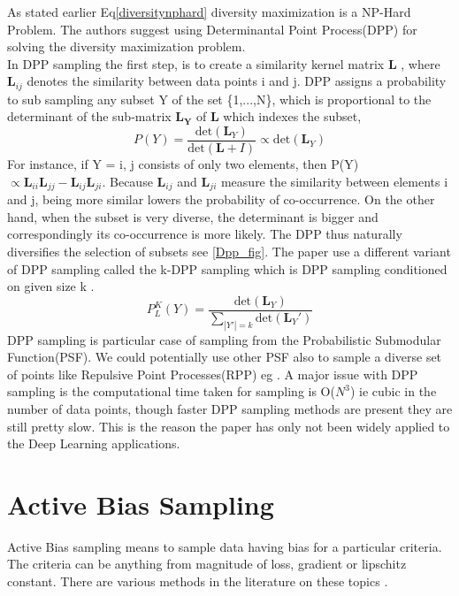 \documentclass[a4paper,twoside]{iiththesis}
\theoremstyle{definition}
\theoremstyle{definition}
\theoremstyle{remark}
\begin{document}
As stated earlier Eq\ref{diversitynphard} diversity maximization is a NP-Hard Problem. The authors suggest using  Determinantal Point Process(DPP) for solving the diversity maximization problem. \\In DPP sampling the first step, is to create a similarity kernel matrix $\mathbf{L}$ , where $\mathbf{L}_{ij}$ denotes the similarity between data points i and j. DPP assigns a probability to sub sampling any subset Y of the set \{1,...,N\}, which is proportional to the determinant of the sub-matrix $\mathbf{L_Y}$ of   $\mathbf{L}$ which indexes the subset,
\begin{equation} 
P(Y) = \frac{\text{det}(\mathbf{L}_Y )} { \text{det}(\mathbf{L}+I)} \propto \text{det}(\mathbf{L}_Y)
\end{equation}
For instance, if Y = {i, j} consists of only two elements,
then P(Y) $\propto \mathbf{L}_{ii} \mathbf{L}_{jj} - \mathbf{L}_{ij}\mathbf{L}_{ji}$. Because $\mathbf{L}_{ij}$ and $\mathbf{L}_{ji}$ measure the similarity between elements i and j, being more similar lowers the probability of co-occurrence. On the other hand, when the subset is very diverse, the determinant is bigger and correspondingly its co-occurrence is more likely. The
DPP thus naturally diversifies the selection of subsets see \ref{Dpp_fig}. The paper use a different variant of DPP sampling called the k-DPP sampling which is DPP sampling conditioned on given size k .
\begin{equation}
P_{L} ^ K (Y) = \frac{\text{det}(\mathbf{L}_Y )} { \sum_{|Y'| =k }\text{det}(\mathbf{L}_{Y}')} 
\end{equation}
 DPP sampling is particular case of sampling from the Probabilistic Submodular Function(PSF). We could potentially use other PSF also to sample a diverse set of points like Repulsive Point Processes(RPP) eg \cite{zhang2018active}. A major issue with DPP sampling is the computational time taken for sampling is O($N^3$) ie cubic in the number of data points, though faster DPP sampling methods are present they are still pretty slow. This is the reason the paper has only not been widely applied to the Deep Learning applications.

\chapter{Active Bias Sampling}

Active Bias sampling means to sample data having bias for a particular criteria. The criteria can be anything from magnitude of loss, gradient or lipschitz constant. There are various methods in the literature on these topics \cite{katharopoulos2017biased} \cite{katharopoulos2018not} \cite{zhao2015stochastic} \cite{chang2017active}.
\end{document}
